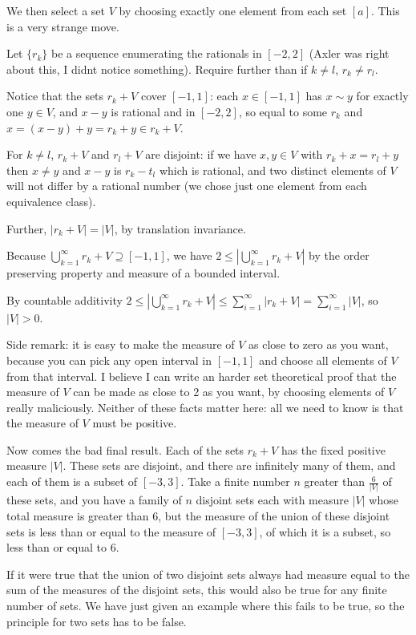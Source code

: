 \documentclass[12pt]{article}
\begin{document}
\begin{description}
We then select a set $V$ by choosing exactly one element from each set $[a]$.  This is a very strange move.

Let $\{r_k\}$ be a sequence enumerating the rationals in $[-2,2]$ (Axler was right about this, I didnt notice something).  Require further than if $k \neq l$, $r_k \neq r_l$.

Notice that the sets $r_k+V$ cover $[-1,1]$:  each $x \in [-1,1]$  has $x \sim y$ for exactly one $y \in V$, and $x-y$ is rational and in $[-2,2]$, so equal to some $r_k$
and $x = (x-y)+y = r_k+y \in r_k+V$.

For $k \neq l$, $r_k + V$ and $r_l +V$ are disjoint:  if we have $x,y \in V$ with $r_k + x = r_l + y$ then $x\neq y$ and $x-y$ is $r_k - t_l$ which is rational, and two distinct elements of $V$ will not differ by a rational number (we chose just one element from each equivalence class).

Further, $|r_k+V|=|V|$, by translation invariance.

Because $\bigcup_{k=1}^\infty r_k + V \supseteq [-1,1]$, we have $2 \leq |\bigcup_{k=1}^\infty r_k + V|$ by the order preserving property and measure of a bounded interval.

By countable additivity $2 \leq |\bigcup_{k=1}^\infty r_k + V| \leq \sum_{i=1}^\infty |r_k+V| = \sum_{i=1}^\infty |V|$, so $|V|>0$.

Side remark:  it is easy to make the measure of $V$ as close to zero as you want, because you can pick any open interval in $[-1,1]$ and choose all elements of $V$ from that interval.
I believe I can write an harder set theoretical proof that the measure of $V$ can be made as close to 2 as you want, by choosing elements of $V$ really maliciously.  Neither of these facts
matter here:  all we need to know is that the measure of $V$ must be positive.

Now comes the bad final result.  Each of the sets $r_k+V$ has the fixed positive measure $|V|$.  These sets are disjoint, and there are infinitely many of them, and each of them is a subset of $[-3,3]$.  Take a finite number $n$ greater than $\frac6{|V|}$ of these sets, and you have a family of $n$ disjoint sets each with measure $|V|$ whose total measure is greater
than 6, but the measure of the union of these disjoint sets is less than or equal to the measure of $[-3,3]$, of which it is a subset, so less than or equal to 6.

If it were true that the union of two disjoint sets always had measure equal to the sum of the measures of the disjoint sets, this would also be true for any finite number of sets.
We have just given an example where this fails to be true, so the principle for two sets has to be false.

\end{description}
\end{document}
